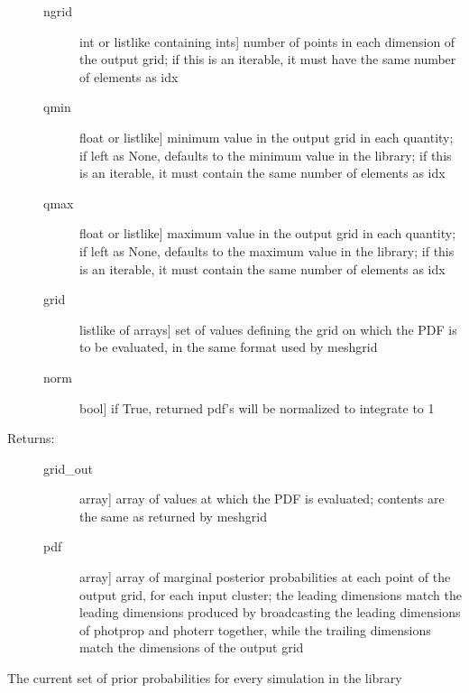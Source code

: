 \documentclass[letterpaper,10pt,english]{sphinxmanual}
\begin{document}
\begin{fulllineitems}
\begin{fulllineitems}
\begin{description}
\begin{description}
\item[{ngrid}] \leavevmode{[}int or listlike containing ints{]}
number of points in each dimension of the output grid;
if this is an iterable, it must have the same number of
elements as idx

\item[{qmin}] \leavevmode{[}float or listlike{]}
minimum value in the output grid in each quantity; if
left as None, defaults to the minimum value in the
library; if this is an iterable, it must contain the
same number of elements as idx

\item[{qmax}] \leavevmode{[}float or listlike{]}
maximum value in the output grid in each quantity; if
left as None, defaults to the maximum value in the
library; if this is an iterable, it must contain the
same number of elements as idx

\item[{grid}] \leavevmode{[}listlike of arrays{]}
set of values defining the grid on which the PDF is to
be evaluated, in the same format used by meshgrid

\item[{norm}] \leavevmode{[}bool{]}
if True, returned pdf's will be normalized to integrate
to 1

\end{description}

\item[{Returns:}] \leavevmode\begin{description}
\item[{grid\_out}] \leavevmode{[}array{]}
array of values at which the PDF is evaluated; contents
are the same as returned by meshgrid

\item[{pdf}] \leavevmode{[}array{]}
array of marginal posterior probabilities at each point
of the output grid, for each input cluster; the leading
dimensions match the leading dimensions produced by
broadcasting the leading dimensions of photprop and
photerr together, while the trailing dimensions match
the dimensions of the output grid

\end{description}

\end{description}

\end{fulllineitems}


\begin{fulllineitems}
\label{bayesphot:slugpy.bayesphot.bp.bp.priors}
The current set of prior probabilities for every
simulation in the library

\end{fulllineitems}


\end{fulllineitems}
\end{document}
